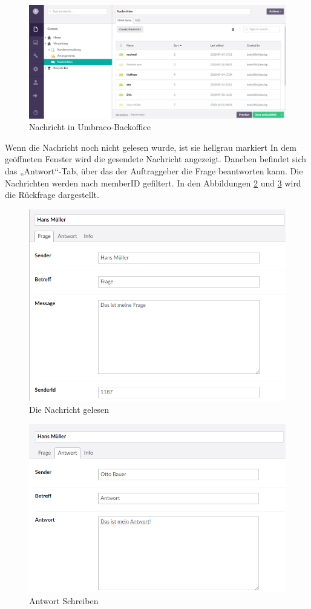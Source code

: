 \begin{figure}[h]
	\centering
	\includegraphics[width=0.7\linewidth]{Graphics/NachrichtUmbraco.png}
	\caption[NachrichtUmbraco]{Nachricht in Umbraco-Backoffice}
	\label{fig:NachrichtUmbraco}
\end{figure}

Wenn die Nachricht noch nicht gelesen wurde, ist sie hellgrau markiert In dem geöffneten Fenster wird die gesendete Nachricht angezeigt. Daneben befindet sich das „Antwort“-Tab, über das der Auftraggeber die Frage beantworten kann. Die Nachrichten werden nach memberID gefiltert. In den Abbildungen \ref{fig:Message} und \ref{fig:antwort} wird die Rückfrage dargestellt.

\begin{figure}[h]
	\centering
	\includegraphics[width=0.7\linewidth]{Graphics/Message.png}
	\caption[Nachricht]{Die Nachricht gelesen}
	\label{fig:Message}
\end{figure}

\begin{figure}[h]
	\centering
	\includegraphics[width=0.7\linewidth]{Graphics/antwortMassege.png}
	\caption[Nachricht]{Antwort Schreiben}
	\label{fig:antwort}
\end{figure}

